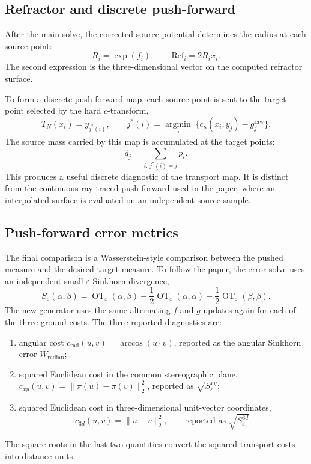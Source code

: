 \documentclass{article}
\begin{document}
\subsection{Refractor and discrete push-forward}

After the main solve, the corrected source potential determines the radius at
each source point:
\[
    R_i=\exp(f_i),
    \qquad
    \mathrm{Ref}_i=2R_i x_i.
\]
The second expression is the three-dimensional vector on the computed
refractor surface.

To form a discrete push-forward map, each source point is sent to the target
point selected by the hard $c$-transform,
\[
    T_N(x_i)=y_{j^*(i)},
    \qquad
    j^*(i)=\underset{j}{\operatorname{argmin}}\;
    \{c_\kappa(x_i,y_j)-g^{\mathrm{raw}}_j\}.
\]
The source mass carried by this map is accumulated at the target points:
\[
    \widehat q_j=\sum_{i:\,j^*(i)=j}p_i.
\]
This produces a useful discrete diagnostic of the transport map.  It is
distinct from the continuous ray-traced push-forward used in the paper, where
an interpolated surface is evaluated on an independent source sample.

\subsection{Push-forward error metrics}

The final comparison is a Wasserstein-style comparison between the pushed
measure and the desired target measure.  To follow the paper, the error solve
uses an independent small-$\varepsilon$ Sinkhorn divergence,
\[
    S_\varepsilon(\alpha,\beta)
    =\operatorname{OT}_\varepsilon(\alpha,\beta)
    -\frac12\operatorname{OT}_\varepsilon(\alpha,\alpha)
    -\frac12\operatorname{OT}_\varepsilon(\beta,\beta).
\]
The new generator uses the same alternating $f$ and $g$ updates again for each of the
three ground costs.  The three reported diagnostics are:
\begin{enumerate}
    \item angular cost $c_{\mathrm{rad}}(u,v)=\arccos(u\cdot v)$, reported as
    the angular Sinkhorn error $W_{\mathrm{radian}}$;
    \item squared Euclidean cost in the common stereographic plane,
    $c_{xy}(u,v)=\|\pi(u)-\pi(v)\|_2^2$, reported as
    $\sqrt{S_\varepsilon^{xy}}$;
    \item squared Euclidean cost in three-dimensional unit-vector coordinates,
    \[
        c_{3d}(u,v)=\|u-v\|_2^2,
        \qquad\text{reported as }\sqrt{S_\varepsilon^{3d}}.
    \]
\end{enumerate}
The square roots in the last two quantities convert the squared transport
costs into distance units.
\end{document}
